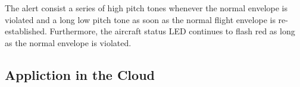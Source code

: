 \documentclass[paper=letter, fontsize=11pt]{scrartcl}
\numberwithin{equation}{section}
\numberwithin{figure}{section}
\numberwithin{table}{section}
\begin{document}
\par
The alert consist a series of high pitch tones whenever the normal envelope
is violated and a long low pitch tone as soon as the normal flight envelope
is re-established. Furthermore, the aircraft status \ac{LED} continues to
flash red as long as the normal envelope is violated.

\subsection{Appliction in the Cloud}
\par

\clearpage
\label{appendix}


\clearpage
\label{bibliography}


\end{document}
